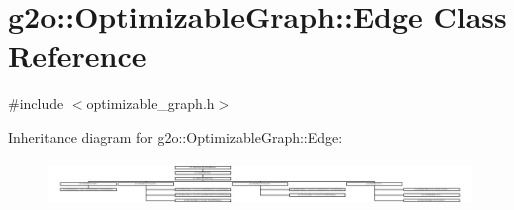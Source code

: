 \hypertarget{classg2o_1_1_optimizable_graph_1_1_edge}{}\section{g2o\+:\+:Optimizable\+Graph\+:\+:Edge Class Reference}
\label{classg2o_1_1_optimizable_graph_1_1_edge}


{\ttfamily \#include $<$optimizable\+\_\+graph.\+h$>$}

Inheritance diagram for g2o\+:\+:Optimizable\+Graph\+:\+:Edge\+:\begin{figure}[H]
\begin{center}
\leavevmode
\includegraphics[height=1.176471cm]{classg2o_1_1_optimizable_graph_1_1_edge}
\end{center}
\end{figure}
